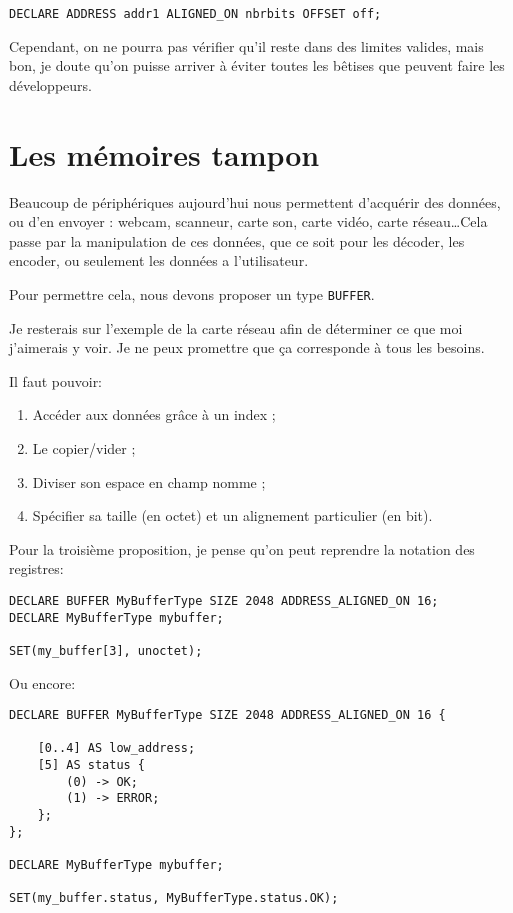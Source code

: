 \documentclass{rtxreport}
\begin{document}
\begin{lstlisting}
DECLARE ADDRESS addr1 ALIGNED_ON nbrbits OFFSET off;
\end{lstlisting}

Cependant, on ne pourra pas vérifier qu’il reste dans des limites valides, mais bon, je doute qu’on puisse arriver à éviter toutes les bêtises que peuvent faire les développeurs.

\section{Les mémoires tampon}

Beaucoup de périphériques aujourd’hui nous permettent d’acquérir des données, ou d’en envoyer : webcam, scanneur, carte son, carte vidéo, carte réseau\ldots Cela passe par la manipulation de ces données, que ce soit pour les décoder, les encoder, ou seulement les données a l’utilisateur.

Pour permettre cela, nous devons proposer un type \texttt{BUFFER}.

Je resterais sur l’exemple de la carte réseau afin de déterminer ce que moi j’aimerais y voir. Je ne peux promettre que ça corresponde à tous les besoins.

Il faut pouvoir:
\begin{enumerate}
	\item Accéder aux données grâce à un index ; 
	\item Le copier/vider ; 
	\item Diviser son espace en champ nomme ; 
	\item Spécifier sa taille (en octet) et un alignement particulier (en bit).
\end{enumerate}

Pour la troisième proposition, je pense qu’on peut reprendre la notation des registres:

\begin{lstlisting}
DECLARE BUFFER MyBufferType SIZE 2048 ADDRESS_ALIGNED_ON 16;
DECLARE MyBufferType mybuffer;

SET(my_buffer[3], unoctet);
\end{lstlisting}

Ou encore:

\begin{lstlisting}
DECLARE BUFFER MyBufferType SIZE 2048 ADDRESS_ALIGNED_ON 16 {

	[0..4] AS low_address;
	[5] AS status {
		(0) -> OK;
		(1) -> ERROR;
	};
};

DECLARE MyBufferType mybuffer;

SET(my_buffer.status, MyBufferType.status.OK);
\end{lstlisting}
\end{document}
